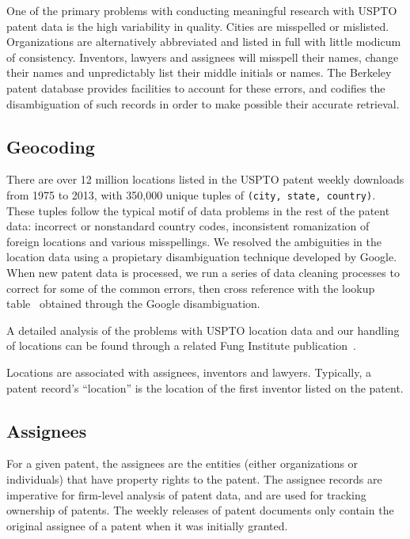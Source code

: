 One of the primary problems with conducting meaningful research with USPTO
patent data is the high variability in quality. Cities are misspelled or
mislisted. Organizations are alternatively abbreviated and listed in full with
little modicum of consistency. Inventors, lawyers and assignees will misspell
their names, change their names and unpredictably list their middle initials or
names. The Berkeley patent database provides facilities to account for these
errors, and codifies the disambiguation of such records in order to make
possible their accurate retrieval.

\subsection{Geocoding}

There are over 12 million locations listed in the USPTO patent weekly downloads
from 1975 to 2013, with 350,000 unique tuples of \verb`(city, state, country)`.
These tuples follow the typical motif of data problems in the rest of the
patent data: incorrect or nonstandard country codes, inconsistent romanization
of foreign locations and various misspellings. We resolved the ambiguities in
the location data using a propietary disambiguation technique developed by
Google. When new patent data is processed, we run a series of data cleaning
processes to correct for some of the common errors, then cross reference with the
lookup table~\cite{geotable} obtained through the Google disambiguation.

A detailed analysis of the problems with USPTO location data and our handling
of locations can be found through a related Fung Institute
publication~\cite{geocoding}. 

Locations are associated with assignees, inventors and lawyers. Typically, a
patent record's ``location'' is the location of the first inventor listed on
the patent.

\subsection{Assignees}

For a given patent, the assignees are the entities (either organizations or
individuals) that have property rights to the patent. The assignee records are
imperative for firm-level analysis of patent data, and are used for tracking
ownership of patents. The weekly releases of patent documents only contain the
original assignee of a patent when it was initially granted.

